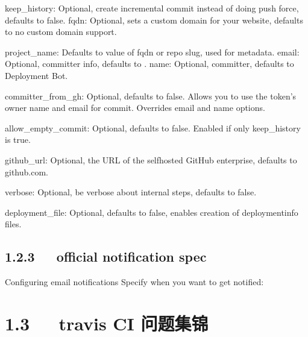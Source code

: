 \documentclass[letterpaper,12pt,english]{sphinxmanual}
\begin{document}
keep\_history: Optional, create incremental commit instead of doing push force, defaults to false.
fqdn: Optional, sets a custom domain for your website, defaults to no custom domain support.

project\_name: Defaults to value of fqdn or repo slug, used for metadata.
email: Optional, committer info, defaults to .
name: Optional, committer, defaults to Deployment Bot.

committer\_from\_gh: Optional, defaults to false. Allows you to use the token’s owner name and email for commit. Overrides email and name options.

allow\_empty\_commit: Optional, defaults to false. Enabled if only keep\_history is true.

github\_url: Optional, the URL of the self\sphinxhyphen{}hosted GitHub enterprise, defaults to github.com.

verbose: Optional, be verbose about internal steps, defaults to false.

deployment\_file: Optional, defaults to false, enables creation of deployment\sphinxhyphen{}info files.


\subsection{1.2.3   official notification spec}
\label{\detokenize{001software/001install/001._u7f51_u7ad9/travisCI:official-notification-spec}}
Configuring email notifications
Specify when you want to get notified:

\begin{sphinxVerbatim}[commandchars=\\\{\}]
       
       
      
      
\end{sphinxVerbatim}


\section{1.3   travis CI 问题集锦}
\label{\detokenize{001software/001install/001._u7f51_u7ad9/travisCI:id3}}
\end{document}
